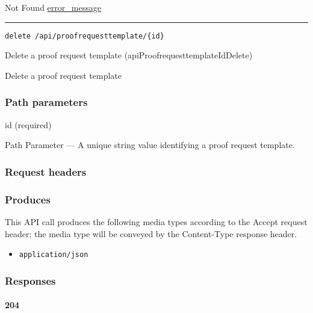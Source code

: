 Not Found \protect\hyperlink{error_message}{error\_message}

\begin{center}\rule{0.5\linewidth}{\linethickness}\end{center}

\protect\hypertarget{apiProofrequesttemplateIdDelete}{}{}

\begin{verbatim}
delete /api/proofrequesttemplate/{id}
\end{verbatim}

Delete a proof request template ({apiProofrequesttemplateIdDelete})

Delete a proof request template

\hypertarget{path-parameters-53}{%
\subsubsection{Path parameters}\label{path-parameters-53}}

id (required)

{Path Parameter} --- A unique string value identifying a proof request
template.

\hypertarget{request-headers-57}{%
\subsubsection{Request headers}\label{request-headers-57}}

\hypertarget{produces-103}{%
\subsubsection{Produces}\label{produces-103}}

This API call produces the following media types according to the
{Accept} request header; the media type will be conveyed by the
{Content-Type} response header.

\begin{itemize}
\tightlist
\item
  \texttt{application/json}
\end{itemize}

\hypertarget{responses-105}{%
\subsubsection{Responses}\label{responses-105}}

\hypertarget{section-345}{%
\paragraph{204}\label{section-345}}

